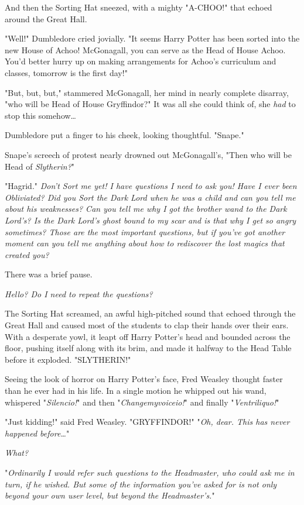 And then the Sorting Hat sneezed, with a mighty "A-CHOO!" that echoed around 
the Great Hall.

"Well!" Dumbledore cried jovially. "It seems Harry Potter has been sorted into 
the new House of Achoo! McGonagall, you can serve as the Head of House Achoo. 
You'd better hurry up on making arrangements for Achoo's curriculum and 
classes, tomorrow is the first day!"

"But, but, but," stammered McGonagall, her mind in nearly complete disarray, 
"who will be Head of House Gryffindor?" It was all she could think of, she 
\emph{had} to stop this somehow{\ldots}

Dumbledore put a finger to his cheek, looking thoughtful. "Snape."

Snape's screech of protest nearly drowned out McGonagall's, "Then who will be 
Head of \emph{Slytherin?}"

"Hagrid."
\sbreak
\emph{Don't Sort me yet! I have questions I need to ask you! Have I ever been 
Obliviated? Did you Sort the Dark Lord when he was a child and can you tell me 
about his weaknesses? Can you tell me why I got the brother wand to the Dark 
Lord's? Is the Dark Lord's ghost bound to my scar and is that why I get so 
angry sometimes? Those are the most important questions, but if you've got 
another moment can you tell me anything about how to rediscover the lost magics 
that created you?}

There was a brief pause.

\emph{Hello? Do I need to repeat the questions?}

The Sorting Hat screamed, an awful high-pitched sound that echoed through the 
Great Hall and caused most of the students to clap their hands over their ears. 
With a desperate yowl, it leapt off Harry Potter's head and bounded across the 
floor, pushing itself along with its brim, and made it halfway to the Head 
Table before it exploded.
\sbreak
"SLYTHERIN!"

Seeing the look of horror on Harry Potter's face, Fred Weasley thought faster 
than he ever had in his life. In a single motion he whipped out his wand, 
whispered "\emph{Silencio!}" and then "\emph{Changemyvoiceio!}" and finally 
"\emph{Ventriliquo!}"

"Just kidding!" said Fred Weasley. "GRYFFINDOR!"
\sbreak
"\emph{Oh, dear. This has never happened before{\ldots}}"

\emph{What?}

"\emph{Ordinarily I would refer such questions to the Headmaster, who could ask 
me in turn, if he wished. But some of the information you've asked for is not 
only beyond your own user level, but beyond the Headmaster's.}"


